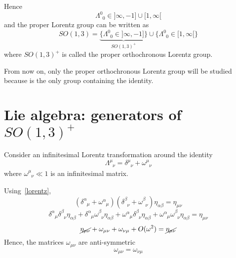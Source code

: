     Hence 
    \begin{equation*}
        \Lambda^0_{\phantom 0 0} \in ]\infty, -1] \cup [1, \infty[
    \end{equation*}
    and the proper Lorentz group can be written as
    \begin{equation*}
        SO(1,3) = \underbrace{\{\Lambda^0_{\phantom 0 0} \in ]\infty, -1]\}}_{SO(1,3)^+} \cup \{\Lambda^0_{\phantom 0 0} \in [1, \infty[\} 
    \end{equation*}
    where $SO(1,3)^+$ is called the proper orthochronous Lorentz group.

    From now on, only the proper orthochronous Lorentz group will be studied because is the only group containing the identity.

\section{Lie algebra: generators of $SO(1,3)^+$}

    Consider an infinitesimal Lorentz transformation around the identity 
    \begin{equation}\label{inf}
        \Lambda^{\mu}_{\phantom \mu \nu} = \delta^{\mu}_{\phantom \mu \nu} + \omega^{\mu}_{\phantom \mu \nu}
    \end{equation}
    where $\omega^{\mu}_{\phantom \mu \nu} \ll 1$ is an infinitesimal matrix.
    
    Using~\eqref{lorentz},
    \begin{equation*}
        (\delta^{\alpha}_{\phantom \alpha \mu} + \omega^{\alpha}_{\phantom \alpha \mu} )( \delta^{\beta}_{\phantom \beta \nu} + \omega^{\beta}_{\phantom \beta \nu} )\eta_{\alpha \beta} = \eta_{\mu \nu}
    \end{equation*}
    \begin{equation*}
        \delta^{\alpha}_{\phantom \alpha \mu} \delta^{\beta}_{\phantom \beta \nu} \eta_{\alpha \beta} + \delta^{\alpha}_{\phantom \alpha \mu} \omega^{\beta}_{\phantom \beta \nu} \eta_{\alpha \beta} + \omega^{\alpha}_{\phantom \alpha \mu} \delta^{\beta}_{\phantom \beta \nu} \eta_{\alpha \beta} + \omega^{\alpha}_{\phantom \alpha \mu} \omega^{\beta}_{\phantom \beta \nu} \eta_{\alpha \beta} = \eta_{\mu \nu}
    \end{equation*}
    \begin{equation*}
        \cancel{\eta_{\mu \nu}} + \omega_{\mu \nu} + \omega_{\nu\mu} + O(\omega^2) = \cancel{\eta_{\mu \nu}}
    \end{equation*}
    Hence, the matrices $\omega_{\mu\nu}$ are anti-symmetric
    \begin{equation*}
        \omega_{\mu \nu} = \omega_{\nu \mu}
    \end{equation*}

